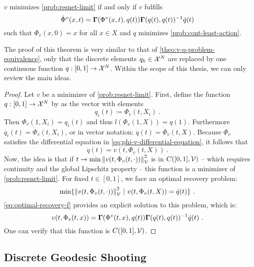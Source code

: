 \begin{theorem}
	\label{theo:v-q-continuous-problem-equivalence}
	$v$ minimizes \cref{prob:resnet-limit} if and only if $v$ fulfills
	\begin{equation}
			\dot{\Phi}^v(x, t) = \mathbf{\Gamma}(\Phi^v(x, t), q(t)) \mathbf{\Gamma}(q(t), q(t))^{-1} \dot{q}(t)
	\end{equation}
	such that $\Phi_v(x, 0) = x$ for all $x \in X$ and $q$ minimizes \cref{prob:cont-least-action}.
\end{theorem}
The proof of this theorem is very similar to that of \cref{theo:v-q-problem-equivalence}, only that the discrete elements $q_k \in \mathcal{X}^N$ are replaced by one continuous function $q: [0, 1] \rightarrow \mathcal{X}^N$.
Within the scope of this thesis, we can only review the main ideas.
\begin{proof}
	Let $v$ be a minimizer of \cref{prob:resnet-limit}.
	First, define the function $q: [0, 1] \rightarrow \mathcal{X}^N$ by as the vector with elements
	\begin{equation}
		q_i(t) \coloneqq \Phi_v(t, X_i) \ .
	\end{equation}
	Then $\Phi_v(1, X_i) = q_i(t)$ and thus $l(\Phi_v(1, X)) = q(1)$.
	Furthermore $\dot{q_i}(t) = \dot{\Phi}_v(t, X_i)$, or in vector notation: $\dot{q}(t) = \dot{\Phi}_v(t, X)$.
	Because $\Phi_v$ satisfies the differential equation in \cref{eq:phi-v-differential-equation}, it follows that
	\begin{equation}
		\dot{q}(t) = v(t, \Phi_v(t, X)) \ .
	\end{equation}
	Now, the idea is that if $t \rightarrow \min \norm{v(t, \Phi_v(t, \cdot))}_{\mathcal{V}}^2$ is in $C([0, 1], \mathcal{V})$ -- which requires continuity and the global Lipschitz property -- this function is a minimizer of \cref{prob:resnet-limit}.
	For fixed $t \in [0, 1]$, we face an optimal recovery problem:
	\begin{equation}
		\min\{\norm{v(t, \Phi_v(t, \cdot))}_\cV^2\ |\ v(t, \Phi_v(t, X)) = \dot{q}(t)\} \ .
	\end{equation}
	\cref{eq:optimal-recovery-f} provides an explicit solution to this problem, which is:
	\begin{equation}
		v(t, \Phi_v(t, x)) = \mathbf{\Gamma}(\Phi^v(t, x), q(t))\mathbf{\Gamma}(q(t), q(t))^{-1}\dot{q}(t) \ .
	\end{equation}
	One can verify that this function is $C([0, 1], \mathcal{V})$.
\end{proof}

\subsection{Discrete Geodesic Shooting}

